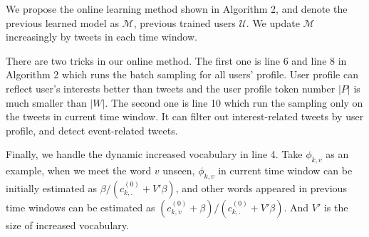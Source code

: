 \documentclass{llncs}
\begin{document}
We propose the online learning method shown in Algorithm 2, and denote the previous learned model as \(\mathcal{M}\), previous trained users \(\mathcal{U}\).
We update \(\mathcal{M}\) increasingly by tweets in each time window.

There are two tricks in our online method.
The first one is line 6 and line 8 in Algorithm 2 which runs the batch sampling for all users' profile.
User profile can reflect user's interests better than tweets and the user profile token number \(|P|\) is much smaller than \(|W|\).
The second one is line 10 which run the sampling only on the tweets in current time window.
It can filter out interest-related tweets by user profile, and detect event-related tweets.

Finally, we handle the dynamic increased vocabulary in line 4.
Take \(\phi_{k,v}\) as an example, when we meet the word \(v\) unseen, \(\phi_{k,v}\) in current time window can be initially estimated as \(\beta / (c^{(0)}_{k,.}+V'\beta)\), and other words appeared in previous time windows can be estimated as \((c^{(0)}_{k,v}+\beta) / (c^{(0)}_{k,.}+V'\beta)\).
And \(V'\) is the size of increased vocabulary.

\end{document}
